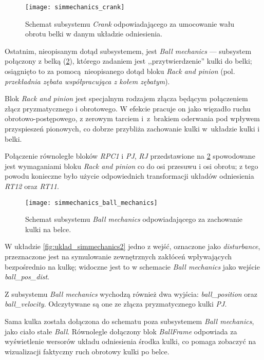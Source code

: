\begin{figure}[h]
    \centering
    \texttt{[image: simmechanics\_crank]}
    \caption{Schemat subsystemu \textit{Crank} odpowiadającego za umocowanie wału obrotu belki w danym układzie odniesienia.}
    \label{fig:sm_crank}
\end{figure}

Ostatnim, nieopisanym dotąd subsystemem, jest \textit{Ball mechanics} --- subsystem połączony z belką (\cref{fig:sm_ball_mechanics}), którego zadaniem jest ,,przytwierdzenie'' kulki do belki; osiągnięto to za pomocą nieopisanego dotąd bloku \textit{Rack and pinion} (pol. \textit{przekładnia zębata współpracująca z kołem zębatym}).

Blok \textit{Rack and pinion} jest specjalnym rodzajem złącza będącym połączeniem złącz pryzmatycznego i obrotowego. W efekcie pracuje on jako więzadło ruchu obrotowo-postępowego, z zerowym tarciem i~z~brakiem oderwania pod wpływem przyspieszeń pionowych, co dobrze przybliża zachowanie kulki w~układzie kulki i belki.

Połączenie równoległe bloków \textit{RPC1} i \textit{PJ}, \textit{RJ} przedstawione na \cref{fig:sm_ball_mechanics} spowodowane jest wymaganiami bloku \textit{Rack and pinion} co do osi przesuwu i osi obrotu; z tego powodu konieczne było użycie odpowiednich transformacji układów odniesienia \textit{RT12} oraz \textit{RT11}.

\begin{figure}[h]
    \centering
    \texttt{[image: simmechanics\_ball\_mechanics]}
    \caption{Schemat subsystemu \textit{Ball mechanics} odpowiadającego za zachowanie kulki na belce.}
    \label{fig:sm_ball_mechanics}
\end{figure}

W układzie \cref{fig:uklad_simmechanics2} jedno z wejść, oznaczone jako \textit{disturbance}, przeznaczone jest na symulowanie zewnętrznych zakłóceń wpływających bezpośrednio na kulkę; widoczne jest to w schemacie \textit{Ball mechanics} jako wejście \textit{ball\_pos\_dist}.

Z subsystemu \textit{Ball mechanics} wychodzą również dwa wyjścia: \textit{ball\_position} oraz \textit{ball\_velocity}. Odczytywane są one ze złącza pryzmatycznego kulki \textit{PJ}.

Sama kulka została dołączona do schematu poza subsystemem \textit{Ball mechanics}, jako ciało stałe \textit{Ball}. Równolegle dołączony blok \textit{BallFrame} odpowiada za wyświetlenie wersorów układu odniesienia środka kulki, co pomaga zobaczyć na wizualizacji faktyczny ruch obrotowy kulki po belce.

